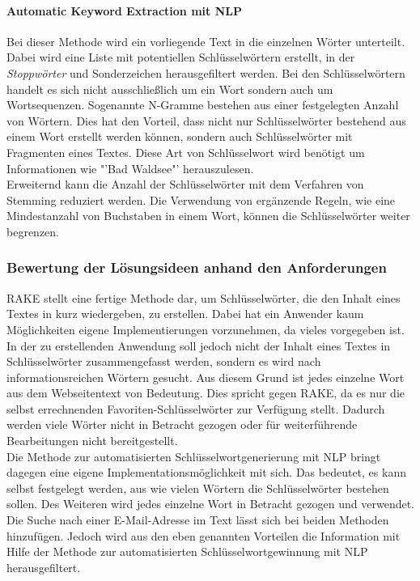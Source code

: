			\paragraph{Automatic Keyword Extraction mit NLP}
			Bei dieser Methode wird ein vorliegende Text in die einzelnen Wörter unterteilt. Dabei wird eine Liste mit potentiellen Schlüsselwörtern erstellt, in der \textit{Stoppwörter} und Sonderzeichen herausgefiltert werden. Bei den Schlüsselwörtern handelt es sich nicht ausschließlich um ein Wort sondern auch um Wortsequenzen. Sogenannte N-Gramme bestehen aus einer festgelegten Anzahl von Wörtern. Dies hat den Vorteil, dass nicht nur Schlüsselwörter bestehend aus einem Wort erstellt werden können, sondern auch Schlüsselwörter mit Fragmenten eines Textes. Diese Art von Schlüsselwort wird benötigt um Informationen wie "'Bad Waldsee"' herauszulesen.\\
			Erweiternd kann die Anzahl der Schlüsselwörter mit dem Verfahren von Stemming reduziert werden. Die Verwendung von ergänzende Regeln, wie eine Mindestanzahl von Buchstaben in einem Wort, können die Schlüsselwörter weiter begrenzen.
	
		\subsubsection{Bewertung der Lösungsideen anhand den Anforderungen}
		RAKE stellt eine fertige Methode dar, um Schlüsselwörter, die den Inhalt eines Textes in kurz wiedergeben, zu erstellen. Dabei hat ein Anwender kaum Möglichkeiten eigene Implementierungen vorzunehmen, da vieles vorgegeben ist. In der zu erstellenden Anwendung soll jedoch nicht der Inhalt eines Textes in Schlüsselwörter zusammengefasst werden, sondern es wird nach informationsreichen Wörtern gesucht. Aus diesem Grund ist jedes einzelne Wort aus dem Webseitentext von Bedeutung. Dies spricht gegen RAKE, da es nur die selbst errechnenden Favoriten-Schlüsselwörter zur Verfügung stellt. Dadurch werden viele Wörter nicht in Betracht gezogen oder für weiterführende Bearbeitungen nicht bereitgestellt.\\
		Die Methode zur automatisierten Schlüsselwortgenerierung mit NLP bringt dagegen eine eigene Implementationsmöglichkeit mit sich. Das bedeutet, es kann selbst festgelegt werden, aus wie vielen Wörtern die Schlüsselwörter bestehen sollen. Des Weiteren wird jedes einzelne Wort in Betracht gezogen und verwendet.\\ Die Suche nach einer E-Mail-Adresse im Text lässt sich bei beiden Methoden hinzufügen. Jedoch wird aus den eben genannten Vorteilen die Information mit Hilfe der Methode zur automatisierten Schlüsselwortgewinnung mit NLP herausgefiltert.
		
